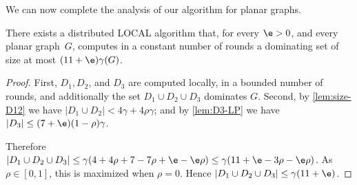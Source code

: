 
We can now complete the analysis of our algorithm for planar graphs.
\begin{theorem}\label{thm:planar-ccl}
  There exists a distributed LOCAL algorithm that, for every $\e>0$, and every
  planar graph~$G$, computes in a constant number of rounds a dominating set
  of size at most $(11+\e)\gamma(G)$.
\end{theorem}
\begin{proof}
  First, $D_1,D_2$, and $D_3$ are computed locally, in a bounded number of
  rounds, and additionally the set $D_1 \cup D_2 \cup D_3$ dominates $G$.
%
  Second, by \cref{lem:size-D12} we have $|D_1\cup D_2|<4\gamma+4\rho\gamma$;
  and by \cref{lem:D3-LP} we have $|D_3|\leq (7+\e)(1-\rho)\gamma$.

  Therefore $|D_1 \cup D_2 \cup D_3|\leq \gamma(4+4\rho +7 - 7\rho +\e - \e\rho)
  \leq \gamma(11+\e-3\rho -\e\rho)$.
  As $\rho\in[0,1]$, this is maximized when $\rho=0$. Hence
  $|D_1 \cup D_2 \cup D_3| \le \gamma(11+\e)$.
\end{proof}
